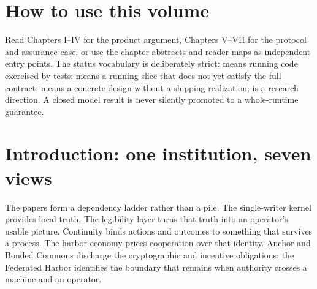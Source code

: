 \section*{How to use this volume}
Read Chapters I--IV for the product argument, Chapters V--VII for the protocol
and assurance case, or use the chapter abstracts and reader maps as independent
entry points. The status vocabulary is deliberately strict: \Built{} means
running code exercised by tests; \BuiltWeak{} means a running slice that does not
yet satisfy the full contract; \Designed{} means a concrete design without a
shipping realization; \Vision{} is a research direction. A closed model result
is never silently promoted to a whole-runtime guarantee.

\begingroup\small\sloppy
\tableofcontents
\endgroup
\clearpage
\begingroup\small\sloppy
\listoffigures
\endgroup
\clearpage
\begingroup\small\sloppy
\listoftables
\endgroup
\clearpage

\section{Introduction: one institution, seven views}
The papers form a dependency ladder rather than a pile. The single-writer kernel
provides local truth. The legibility layer turns that truth into an operator's
usable picture. Continuity binds actions and outcomes to something that survives
a process. The harbor economy prices cooperation over that identity. Anchor and
Bonded Commons discharge the cryptographic and incentive obligations; the
Federated Harbor identifies the boundary that remains when authority crosses a
machine and an operator.

